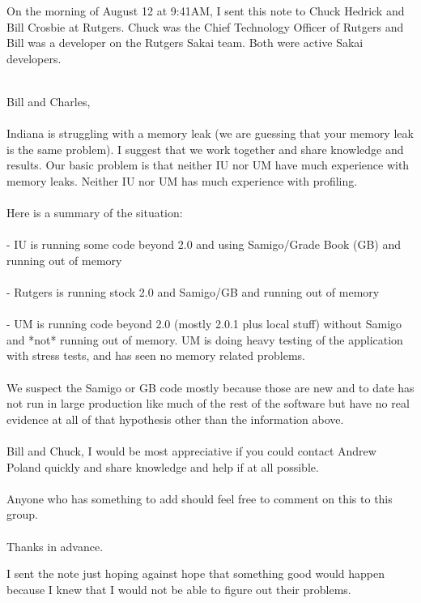 \documentclass[12pt]{book}
\begin{document}
On the morning of August 12 at 9:41AM, I sent this note to
Chuck Hedrick and Bill Crosbie at Rutgers.  Chuck was
the Chief Technology Officer of Rutgers and Bill was a
developer on the Rutgers Sakai team.  Both were active Sakai
developers.\\
\\
\begin{sf}
Bill and Charles,\\
\\
Indiana is struggling with a memory leak (we
are guessing that your memory leak is the same
problem).  I suggest that we work together and
share knowledge and results.   Our basic problem
is that neither IU nor UM have much experience
with memory leaks.  Neither IU nor UM has much
experience with profiling.\\
\\
Here is a summary of the situation:\\
\\
- IU is running some code beyond 2.0 and
using Samigo/Grade Book (GB) and running out of memory\\
\\
- Rutgers is running stock 2.0 and Samigo/GB
and running out of memory\\
\\
- UM is running code beyond 2.0 (mostly 2.0.1
plus local stuff) without Samigo and *not*
running out of memory.  UM is doing heavy testing
of the application with stress tests, and has
seen no memory related problems.\\
\\
We suspect the Samigo or GB code mostly because
those are new and to date has not run in large
production like much of the rest of the software
but have no real evidence at all of that
hypothesis other than the information above.\\
\\
Bill and Chuck,  I would be most appreciative if
you could contact Andrew Poland quickly and
share knowledge and help if at all possible.\\
\\
Anyone who has something to add should feel free
to comment on this to this group.\\
\\
Thanks in advance.\\
\end{sf}

I sent the note just hoping against hope that something
good would happen because I knew that I would not
be able to figure out their problems.
\end{document}
